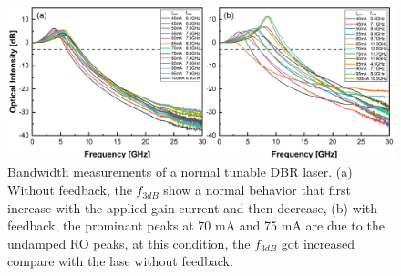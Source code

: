 \begin{figure}[ht]
    \centering
    \includegraphics[width=\linewidth]{figures/bandwidth_gain_scan_cleaved_and_lensed_grating_4679.png}
    \caption{Bandwidth measurements of a normal tunable DBR laser. (a) Without feedback, the $f_{3dB}$ show a normal behavior that first increase with the applied gain current and then decrease, (b) with feedback, the prominant peaks at 70 mA and 75 mA are due to the undamped RO peaks, at this condition, the $f_{3dB}$ got increased compare with the lase without feedback.}
    \label{fig:bandwidth_gain_scan_cleaved_and_lensed}
\end{figure}




